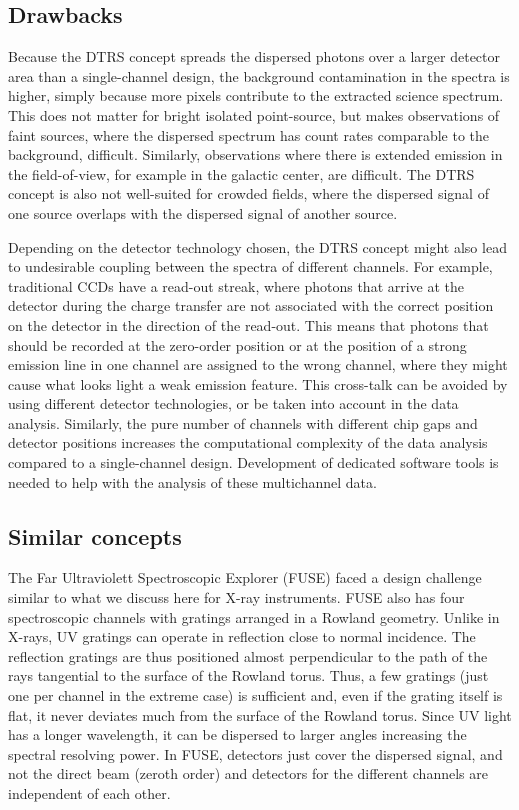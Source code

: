 \documentclass[linenumbers]{aastex631}
\begin{document}


\subsection{Drawbacks}
Because the DTRS concept spreads the dispersed photons over a larger detector area than a single-channel design, the background contamination in the spectra is higher, simply because more pixels contribute to the extracted science spectrum. This does not matter for bright isolated point-source, but makes observations of faint sources, where the dispersed spectrum has count rates comparable to the background, difficult. Similarly, observations where there is extended emission in the field-of-view, for example in the galactic center, are difficult. The DTRS concept is also not well-suited for crowded fields, where the dispersed signal of one source overlaps with the dispersed signal of another source.

Depending on the detector technology chosen, the DTRS concept might also lead to undesirable coupling between the spectra of different channels. For example, traditional CCDs have a read-out streak, where photons that arrive at the detector during the charge transfer are not associated with the correct position on the detector in the direction of the read-out. This means that photons that should be recorded at the zero-order position or at the position of a strong emission line in one channel are assigned to the wrong channel, where they might cause what looks light a weak emission feature. This cross-talk can be avoided by using different detector technologies, or be taken into account in the data analysis. Similarly, the pure number of channels with different chip gaps and detector positions increases the computational complexity of the data analysis compared to a single-channel design. Development of dedicated software tools is needed to help with the analysis of these multichannel data.



\subsection{Similar concepts}

The Far Ultraviolett Spectroscopic Explorer (FUSE) \citep{2000ApJ...538L...1M} faced a design challenge similar to what we discuss here for X-ray instruments. FUSE also has four spectroscopic channels with gratings arranged in a Rowland geometry. Unlike in X-rays, UV gratings can operate in reflection close to normal incidence. The reflection gratings are thus positioned almost perpendicular to the path of the rays tangential to the surface of the Rowland torus. Thus, a few gratings (just one per channel in the extreme case) is sufficient and, even if the grating itself is flat, it never deviates much from the surface of the Rowland torus. Since UV light has a longer wavelength, it can be dispersed to larger angles increasing the spectral resolving power. In FUSE, detectors just cover the dispersed signal, and not the direct beam (zeroth order) and detectors for the different channels are independent of each other.
\end{document}
